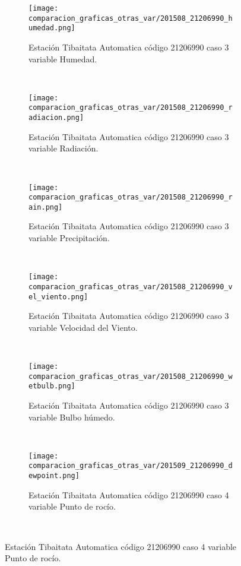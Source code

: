 \begin{figure}[H]
\centering
\begin{subfigure}[normla]{0.4\textwidth}
\caption{Estación Tibaitata Automatica código 21206990 caso 3 variable Humedad.}
\texttt{[image: comparacion\_graficas\_otras\_var/201508\_21206990\_humedad.png]}
\end{subfigure}
~
\begin{subfigure}[normla]{0.4\textwidth}
\caption{Estación Tibaitata Automatica código 21206990 caso 3 variable Radiación.}
\texttt{[image: comparacion\_graficas\_otras\_var/201508\_21206990\_radiacion.png]}
\end{subfigure}
~
\begin{subfigure}[normla]{0.4\textwidth}
\caption{Estación Tibaitata Automatica código 21206990 caso 3 variable Precipitación.}
\texttt{[image: comparacion\_graficas\_otras\_var/201508\_21206990\_rain.png]}
\end{subfigure}
~
\begin{subfigure}[normla]{0.4\textwidth}
\caption{Estación Tibaitata Automatica código 21206990 caso 3 variable Velocidad del Viento.}
\texttt{[image: comparacion\_graficas\_otras\_var/201508\_21206990\_vel\_viento.png]}
\end{subfigure}
~
\begin{subfigure}[normla]{0.4\textwidth}
\caption{Estación Tibaitata Automatica código 21206990 caso 3 variable Bulbo húmedo.}
\texttt{[image: comparacion\_graficas\_otras\_var/201508\_21206990\_wetbulb.png]}
\end{subfigure}
~
\begin{subfigure}[normla]{0.4\textwidth}
\caption{Estación Tibaitata Automatica código 21206990 caso 4 variable Punto de rocío.}
\texttt{[image: comparacion\_graficas\_otras\_var/201509\_21206990\_dewpoint.png]}
\end{subfigure}
~
\end{figure}
           
